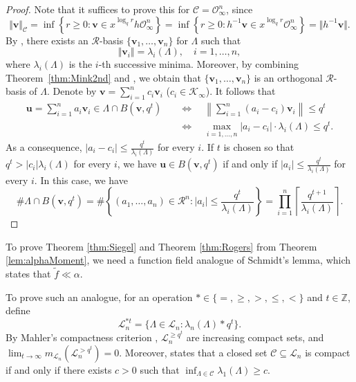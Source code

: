 \documentclass[11pt,a4paper,reqno]{amsart}
\theoremstyle{definition}
\theoremstyle{remark}
\numberwithin{equation}{section}
\begin{document}
\begin{proof}
    Note that it suffices to prove this for $\mathcal{C}=\mathcal{O}_{\infty}^n$, since 
    \begin{equation}
        \Vert \mathbf{v}\Vert_{\mathcal{C}}=\inf\left\{r\geq 0:\mathbf{v}\in x^{\log_qr}h\mathcal{O}_{\infty}^n\right\}=\inf\left\{r\geq 0:h^{-1}\mathbf{v}\in x^{\log_qr}\mathcal{O}_{\infty}^n\right\}=\Vert h^{-1}\mathbf{v}\Vert.
    \end{equation}
    By \cite[Theorem 1.21]{A}, there exists an $\mathcal{R}$-basis $\{\mathbf v_1, \ldots, \mathbf v_n\}$ for $\Lambda$ such that 
    $$\Vert \mathbf{v}_i\Vert=\lambda_i(\Lambda),\quad i=1,\dots,n,$$
    where $\lambda_i(\Lambda)$ is the $i$-th successive minima. Moreover, by combining Theorem~\ref{thm:Mink2nd} and \cite[Theorem 1.21]{A}, we obtain that $\{\mathbf{v}_1,\dots,\mathbf{v}_n\}$ is an orthogonal $\mathcal{R}$-basis of $\Lambda$. Denote by $\mathbf v=\sum_{i=1}^n c_i\mathbf v_i$ ($c_i\in \mathcal K_\infty$). It follows that
    \[\begin{split}
    \mathbf u=\sum_{i=1}^n a_i\mathbf v_i\in \Lambda\cap B(\mathbf v, q^t)
    \quad &\Leftrightarrow\quad \left\|\sum_{i=1}^n (a_i-c_i)\mathbf v_i\right\|\le q^t\\
    &\Leftrightarrow\quad \max_{i=1,\ldots, n} |a_i-c_i|\cdot \lambda_i(\Lambda) \le q^t.
    \end{split}\]
    As a consequence, $\vert a_i-c_i\vert\leq \frac{q^t}{\lambda_i(\Lambda)}$ for every $i$. If $t$ is chosen so that $q^t>\vert c_i\vert\lambda_i(\Lambda)$ for every $i$, we have $\mathbf{u}\in B(\mathbf{v},q^t)$ if and only if $\vert a_i\vert\leq \frac{q^t}{\lambda_i(\Lambda)}$ for every $i$. In this case, we have
    $$\#\Lambda\cap B(\mathbf{v},q^t)=\#\left\{(a_1,\dots,a_n)\in \mathcal{R}^n:\vert a_i\vert\leq \frac{q^t}{\lambda_i(\Lambda)}\right\}=\prod_{i=1}^n\left\lceil\frac{q^{t+1}}{\lambda_i(\Lambda)}\right\rceil.$$
\end{proof}
To prove Theorem \ref{thm:Siegel} and Theorem \ref{thm:Rogers} from Theorem \ref{lem:alphaMoment}, we need a function field analogue of Schmidt's lemma, which states that $\widetilde{f}\ll \alpha$. 

To prove such an analogue, for an operation $*\in \{=,\geq ,>,\leq,<\}$ and $t\in \mathbb{Z}$, define 
     $$\mathcal{L}_n^{*t}=\{\Lambda\in \mathcal{L}_n:\lambda_n(\Lambda)*q^t\}.$$
     By Mahler's compactness criterion \cite[Theorem 1.1]{KST}, $\mathcal{L}_n^{\geq q^t}$ are increasing compact sets, and $\lim_{t\rightarrow \infty}m_{\mathcal{L}_n}\left(\mathcal{L}_n^{>q^t}\right)=0$. Moreover, \cite[Theorem 1.1]{KST} states that a closed set $\mathcal{C}\subseteq \mathcal{L}_n$ is compact if and only if there exists $c>0$ such that $\inf_{\Lambda\in \mathcal{C}}\lambda_1(\Lambda)\geq c$. 
\end{document}
